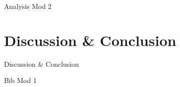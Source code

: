 \documentclass[12pt, a4paper]{report}
\makeatletter
\let\plainappendixpage\appendixpage
\renewcommand{\appendixpage}{%
  \begingroup
  \let\ps@plain\ps@empty
  \plainappendixpage
  \endgroup}
\makeatother
\begin{document}
		{Analysis Mod 2}
        


        

\chapter{{Discussion \& Conclusion}}

		{Discussion & Conclusion}
    
        
        
        
%        

        
\clearpage

{Bib Mod 1}


\clearpage




\end{document}
